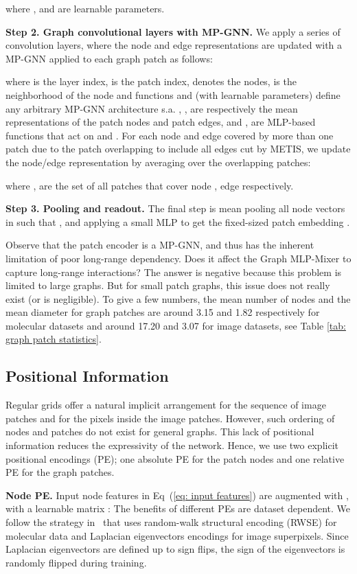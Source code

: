\documentclass{article}
\begin{document}
where ,  and  are learnable parameters. 


\textbf{Step 2. Graph convolutional layers with MP-GNN.} We apply a series of  convolution layers, where the node and edge representations are updated with a MP-GNN applied to each graph patch  as follows:

where  is the layer index,  is the patch index,  denotes the nodes,  is the neighborhood of the node  and functions  and  (with learnable parameters) define any arbitrary MP-GNN architecture s.a. \citep{kipf2017semi,bresson2017gatedgcn,hu2019gine,dwivedi2021generalization}, ,  are respectively the mean representations of the patch nodes and patch edges, and ,  are MLP-based functions that act on  and . 
For each node and edge covered by more than one  patch due to the patch overlapping to include all edges cut by METIS, we update the node/edge representation by averaging over the overlapping patches:

where ,  are the set of all patches that cover node , edge  respectively.

\textbf{Step 3. Pooling and readout.} The final step is mean pooling all node vectors in  such that , and applying a small MLP to get the fixed-sized patch embedding .

Observe that the patch encoder is a MP-GNN, and thus has the inherent limitation of poor long-range dependency. Does it affect the Graph MLP-Mixer to capture long-range interactions? The answer is negative because this problem is limited to large graphs. But for small patch graphs, this issue does not really exist (or is negligible). To give a few numbers, the mean number of nodes and the mean diameter for graph patches are around 3.15 and 1.82 respectively for molecular datasets and around 17.20 and 3.07 for image datasets, see Table \ref{tab: graph patch statistics}.

\subsection{Positional Information}
Regular grids offer a natural implicit arrangement for the sequence of image patches and for the pixels inside the image patches. However, such ordering of nodes and patches do not exist for general graphs. This lack of positional information reduces the expressivity of the network. Hence, we use two explicit positional encodings (PE); one absolute PE for the patch nodes and one relative PE for the graph patches. 


\textbf{Node PE.} Input node features in Eq~(\ref{eq: input features}) are augmented with , with a learnable matrix :
The benefits of different PEs are dataset dependent. We follow the strategy in~\citep{rampavsek2022recipe} that uses random-walk structural encoding (RWSE) \citep{dwivedi2021graph} for molecular data and Laplacian eigenvectors encodings \citep{dwivedi2020benchmarking} for image superpixels. Since Laplacian eigenvectors are defined up to  sign flips, the sign of the eigenvectors is randomly flipped during training.
\end{document}
